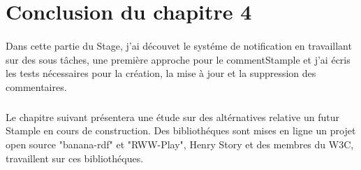 \section{Conclusion du chapitre 4}
\paragraph{}
Dans cette partie du Stage, j'ai découvet le systéme de notification en travaillant sur des sous tâches, une première approche pour le commentStample et j'ai écris les tests nécessaires pour la création, la mise à jour et la suppression des commentaires.
\subparagraph{}
Le chapitre suivant présentera une étude sur des altérnatives relative un futur Stample en cours de construction.
Des bibliothéques sont mises en ligne un projet open source "banana-rdf" et "RWW-Play", Henry Story et des membres du W3C, travaillent sur ces bibliothéques.